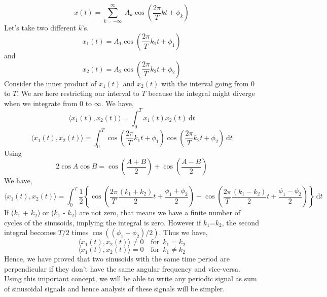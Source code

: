           \begin{equation*}x(t) = \sum_{k=-\infty}^{\infty}\ A_k\cos (\frac{2\pi}{T}kt + \phi_k)\end{equation*}
          Let's take two different $k$'s.
\begin{equation*}
x_1 (t) = A_1 \cos (\frac{2\pi}{T}k_1t + \phi_1)
\end{equation*}
           and \begin{equation*}
x_2 (t) = A_2 \cos (\frac{2\pi}{T}k_2t + \phi_2)
\end{equation*}
          Consider the inner product of $x_1(t)$ and $x_2(t)$ with the interval going from $0$ to $T$. We are here restricting our interval to $T$ because the integral might diverge when we integrate from $0$ to $\infty$. We have,
           \begin{equation*}\langle x_1(t),x_2(t) \rangle = \int_{0}^{T} \! x_1(t)x_2(t) \ \mathrm{d}t\end{equation*}
           \begin{equation*}\langle x_1 (t),x_2 (t) \rangle = \int_{0}^{T} \! \cos (\frac{2\pi}{T}k_1t + \phi_1) \cos (\frac{2\pi}{T}k_2t + \phi_2) \ \mathrm{d}t\end{equation*}
           Using 
          \begin{equation*} 2\cos A \cos B = \cos(\frac{A+B}{2}) + \cos(\frac{A-B}{2})\end{equation*}
          We have,
          \begin{equation*}\langle x_1 (t),x_2 (t) \rangle = \int_{0}^{T} \! \frac{1}{2} \left\lbrace \cos (\frac{2\pi}{T}\frac{(k_1+k_2)}{2}t + \frac{\phi_1+\phi_2}{2}) + \cos (\frac{2\pi}{T}\frac{(k_1-k_2)}{2}t + \frac{\phi_1-\phi_2}{2}) \right\rbrace \ \mathrm{d}t \end{equation*}
                If ($k_1$ + $k_2$) or ($k_1$ - $k_2$) are not zero, that means we have a finite number of cycles of the sinusoids, implying the integral is zero. However if $k_1$=$k_2$, the second integral becomes $T/2$ times $\cos ((\phi_1-\phi_2)/2)$.
                Thus we have,
            \begin{equation*} \langle x_1 (t),x_2 (t) \rangle  \neq 0	\enspace \enspace	\text{for} \enspace k_1 = k_2\end{equation*}
            \begin{equation*} \langle x_1 (t),x_2 (t) \rangle = 0	\enspace \enspace		\text{for} \enspace k_1 \neq k_2\end{equation*}
                Hence, we have proved that two sinusoids with the same time period are perpendicular if they don't have the same angular frequency and vice-versa. Using this important concept, we will be able to write any periodic signal as sum of sinusoidal signals and hence analysis of these signals will be simpler.

